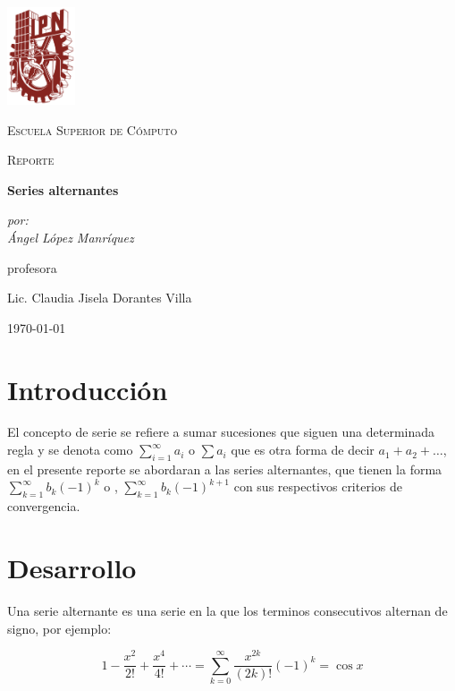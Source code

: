 \documentclass[12pt,letterpaper]{article}
\begin{document}
\begin{titlepage}
	\centering
	\includegraphics[width=0.15\textwidth]{ipn.PNG}\par\vspace{1cm}
	{\scshape\LARGE Escuela Superior de Cómputo \par}
	\vspace{1cm}
	{\scshape\Large Reporte\par}
	\vspace{1.5cm}
	{\huge\bfseries Series alternantes \par}
	\vspace{2cm}
	{\Large\itshape por: \\ Ángel López Manríquez \\ \par}
	\vfill
	profesora\par
	Lic. Claudia Jisela Dorantes Villa

	\vfill

	{\large \today\par}
\end{titlepage}

\section{Introducción}
	El concepto de serie se refiere a sumar sucesiones que siguen una determinada regla y se denota como $ \sum_{i=1}^{\infty} a_i $ o $ \sum a_i $ que es otra forma de decir $  a_1 + a_2 + \ldots $, en el presente reporte se abordaran a las series alternantes, que tienen la forma $ \sum_{k=1}^{\infty} b_k (-1)^k $ o , $ \sum_{k=1}^{\infty} b_k (-1)^{k + 1} $ con sus respectivos criterios de convergencia.

\section{Desarrollo}
	Una serie alternante es una serie en la que los terminos consecutivos alternan de signo, por ejemplo:

	\[ 1-\frac{x^2}{2!}+\frac{x^4}{4!}+\cdots = \displaystyle \sum_{k=0}^{\infty} \frac{x^{2k}}		{(2k)!}(-1)^k = \cos x  \]
\end{document}

